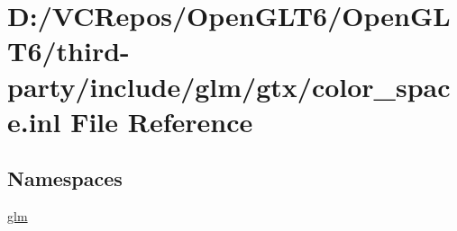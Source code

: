 \hypertarget{gtx_2color__space_8inl}{}\section{D\+:/\+V\+C\+Repos/\+Open\+G\+L\+T6/\+Open\+G\+L\+T6/third-\/party/include/glm/gtx/color\+\_\+space.inl File Reference}
\label{gtx_2color__space_8inl}
\subsection*{Namespaces}
\begin{DoxyCompactItemize}
\item 
 \mbox{\hyperlink{namespaceglm}{glm}}
\end{DoxyCompactItemize}

